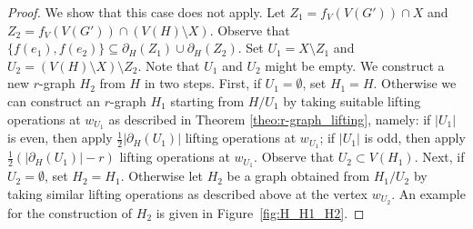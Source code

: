 \documentclass[a4paper,11pt]{article}
\theoremstyle{remark}
\begin{document}
\begin{proof}
We show that this case does not apply. Let $Z_1=f_V(V(G'))\cap X$ and $Z_2=f_V(V(G'))\cap (V(H)\setminus X)$. Observe that $\{ f(e_1),f(e_2) \}\subseteq \partial_H(Z_1)\cup \partial_H(Z_2)$.
	Set $ U_1=X\setminus Z_1 $ and $ U_2= (V(H)\setminus X)\setminus Z_2$. Note that $ U_1$ and $ U_2$ might be empty. We construct a new $r$-graph $H_2$ from $H$ in two steps.
	First, if $ U_1=\emptyset$, set $ H_1=H $. Otherwise we can construct an $r$-graph $ H_1 $ starting from $ H/U_1 $ by taking suitable lifting operations at $w_{U_1}$ as described in Theorem \ref{theo:r-graph_lifting}, namely: if $\vert U_1 \vert$ is even, then apply $\frac{1}{2}\left \vert \partial_H(U_1)\right|$ lifting operations at $w_{U_1}$; if $\vert U_1 \vert$ is odd, then apply $\frac{1}{2}\left( \vert \partial_H(U_1) \vert - r \right)$ lifting operations at $w_{U_1}$.
Observe that $ U_2\subset V(H_1)$. Next, if $ U_2=\emptyset$, set $ H_2=H_1$. Otherwise let $ H_2 $ be a graph obtained from $ H_1/U_2 $ by taking similar lifting operations as described above at the vertex $w_{U_2}$. An example for the construction of $H_2$ is given in Figure~\ref{fig:H_H1_H2}.


\end{proof}
\end{document}
